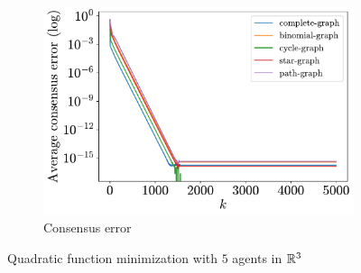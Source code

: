 \documentclass[a4paper,11pt,oneside]{book}
\begin{document}
\begin{figure}[H]
\begin{subfigure}[t]{0.46\linewidth}
            \includegraphics[width=\linewidth]{./figs/quadratic/5_3/consensus.pdf} 
            \caption{Consensus error}
      \end{subfigure}
      \caption{Quadratic function minimization with $5$ agents in ${\mathbb{R}}^{3}$}
      \label{fig:quadratic_5_3}
\end{figure}
\end{document}

